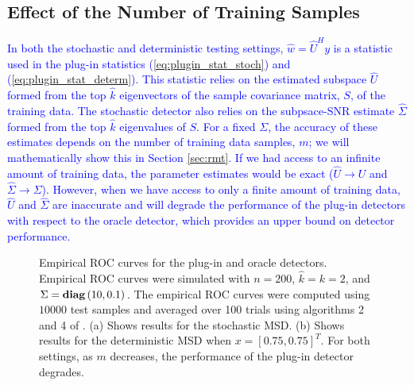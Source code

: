 \subsection{Effect of the Number of Training Samples}\label{sec:training_effect}
\textcolor{blue}{In both the stochastic and deterministic testing settings, $\widehat{w}=\widehat{U}^Hy$ is a statistic used in the plug-in statistics (\ref{eq:plugin_stat_stoch}) and (\ref{eq:plugin_stat_determ}). This statistic relies on the estimated subspace $\widehat{U}$ formed from the top $\widehat{k}$ eigenvectors of the sample covariance matrix, $S$, of the training data. The stochastic detector also relies on the subpsace-SNR estimate $\widehat{\Sigma}$ formed from the top $\widehat{k}$ eigenvalues of $S$. For a fixed $\Sigma$, the accuracy of these estimates depends on the number of training data samples, $m$; we will mathematically show this in Section \ref{sec:rmt}. If we had access to an infinite amount of training data, the parameter estimates would be exact ($\widehat{U}\to U$ and $\widehat{\Sigma}\to\Sigma$). However, when we have access to only a finite amount of training data, $\widehat{U}$ and $\widehat{\Sigma}$ are inaccurate and will degrade the performance of the plug-in detectors with respect to the oracle detector, which provides an upper bound on detector performance.}

\begin{figure}[t]
\centering
{}
\vspace{-0.1in}
\caption{Empirical ROC curves for the plug-in and oracle detectors. Empirical ROC curves were simulated with $n=200$, $\widehat{k}=k=2$, and $\Sigma =\mathop{\bf diag}\left(10,0.1\right)$. The empirical ROC curves were computed using $10000$ test samples and averaged over 100 trials using algorithms 2 and 4 of \cite{fawcett2006introduction}. (a) Shows results for the stochastic MSD. (b) Shows results for the deterministic MSD when $x=[0.75,0.75]^T$. For both settings, as $m$ decreases, the performance of the plug-in detector degrades.}
\label{fig:plugin_v_oracle}
\vspace{-0.3in}
\end{figure}



